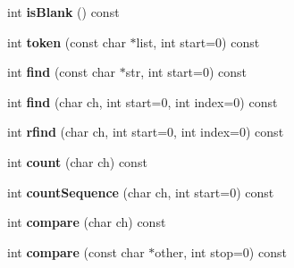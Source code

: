 \begin{DoxyCompactItemize}
\item 
int {\bfseries is\+Blank} () const \hypertarget{class_i_dream_sky_1_1_string_a31a2aaab0d0d76c7cf15e59d218919c5}{}\label{class_i_dream_sky_1_1_string_a31a2aaab0d0d76c7cf15e59d218919c5}

\item 
int {\bfseries token} (const char $\ast$list, int start=0) const \hypertarget{class_i_dream_sky_1_1_string_a4f075eafcc39eb6ffbf279bae833383f}{}\label{class_i_dream_sky_1_1_string_a4f075eafcc39eb6ffbf279bae833383f}

\item 
int {\bfseries find} (const char $\ast$str, int start=0) const \hypertarget{class_i_dream_sky_1_1_string_ad11db2fc5996f6b68236df74a36c1c76}{}\label{class_i_dream_sky_1_1_string_ad11db2fc5996f6b68236df74a36c1c76}

\item 
int {\bfseries find} (char ch, int start=0, int index=0) const \hypertarget{class_i_dream_sky_1_1_string_a9de1993500994518282e3687b44c047b}{}\label{class_i_dream_sky_1_1_string_a9de1993500994518282e3687b44c047b}

\item 
int {\bfseries rfind} (char ch, int start=0, int index=0) const \hypertarget{class_i_dream_sky_1_1_string_aff0afe74d0d23896553ad5086fcdb70a}{}\label{class_i_dream_sky_1_1_string_aff0afe74d0d23896553ad5086fcdb70a}

\item 
int {\bfseries count} (char ch) const \hypertarget{class_i_dream_sky_1_1_string_acc631ddb1797928109f7c23054e9b3f2}{}\label{class_i_dream_sky_1_1_string_acc631ddb1797928109f7c23054e9b3f2}

\item 
int {\bfseries count\+Sequence} (char ch, int start=0) const \hypertarget{class_i_dream_sky_1_1_string_adc3572a0f62de9520902f7e1d131a6f8}{}\label{class_i_dream_sky_1_1_string_adc3572a0f62de9520902f7e1d131a6f8}

\item 
int {\bfseries compare} (char ch) const \hypertarget{class_i_dream_sky_1_1_string_a810f7c45be1c5f8c089c7bec0f2fe788}{}\label{class_i_dream_sky_1_1_string_a810f7c45be1c5f8c089c7bec0f2fe788}

\item 
int {\bfseries compare} (const char $\ast$other, int stop=0) const \hypertarget{class_i_dream_sky_1_1_string_a0c853af6c68ebd59ff53ccc251609183}{}\label{class_i_dream_sky_1_1_string_a0c853af6c68ebd59ff53ccc251609183}


\end{DoxyCompactItemize}
